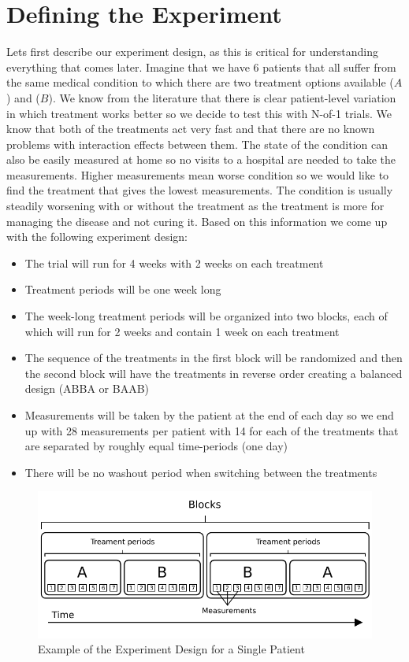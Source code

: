 \documentclass[12pt,a4paper,leqno]{report}
\theoremstyle{plain}
\theoremstyle{definition}
\theoremstyle{remark}
\begin{document}
\section{Defining the Experiment}

Lets first describe our experiment design, as this is critical for understanding
everything that comes later. Imagine that we have 6 patients that all suffer from the
same medical condition to which there are two treatment options available (\(A\)) and (\(B\)). We know from the
literature that there is clear patient-level variation in which treatment works better
so we decide to test this with N-of-1 trials. We know that both of the treatments act
very fast and that there are no known problems with interaction effects between them.
The state of the condition can also be easily measured at home so no visits to
a hospital are needed to take the measurements. Higher measurements mean worse condition
so we would like to find the treatment that gives the lowest measurements. The condition is usually steadily
worsening with or without the treatment as the treatment is more for managing the
disease and not curing it. Based on this information we come up with the following experiment design:

\begin{itemize}
    \item The trial will run for 4 weeks with 2 weeks on each treatment
    \item Treatment periods will be one week long
    \item The week-long treatment periods will be organized into two blocks, each of which will run for
    2 weeks and contain 1 week on each treatment
    \item The sequence of the treatments in the first block will be randomized and then
    the second block will have the treatments in reverse order creating a balanced
    design (ABBA or BAAB)
    \item Measurements will be taken by the patient at the end of each day so we end up with
    28 measurements per patient with 14 for each of the treatments that are separated by
    roughly equal time-periods (one day)
    \item There will be no washout period when switching between the treatments
\end{itemize}

\begin{figure}[H]
    \centering
    \caption{Example of the Experiment Design for a Single Patient}
    \includegraphics{design_for_simulated_experiment.pdf}
\end{figure}
\end{document}
